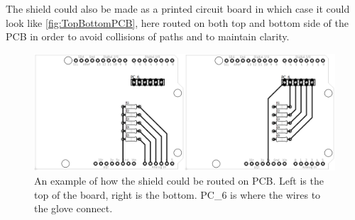 The shield could also be made as a printed circuit board in which case it could look like \autoref{fig:TopBottomPCB}, here routed on both top and bottom side of the PCB in order to avoid collisions of paths and to maintain clarity.

\begin{figure}[H]
\centering
\includegraphics[scale=0.15]{Figure/TopBottomPCB.png}
\caption{An example of how the shield could be routed on PCB. Left is the top of the board, right is the bottom. PC\_6 is where the wires to the glove connect.}
\label{fig:TopBottomPCB}
\end{figure}
